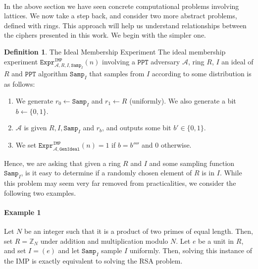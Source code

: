 \documentclass{article}
\theoremstyle{definition}
\newtheorem{definition}{Definition}[section]
\theoremstyle{example}
\newcommand{\A}{\mathcal{A}}
\newcommand{\Int}{\mathbb{Z}}
\newcommand{\PPT}{\texttt{PPT}}
\newcommand{\Expr}[2]{\texttt{Expr}^{\texttt{#1}}_{#2}}
\newcommand{\GenIdeal}{\texttt{GenIdeal}}
\newcommand{\Samp}{\texttt{Samp}}
\begin{document}
\paragraph{} In the above section we have seen concrete computational problems
involving lattices. We now take a step back, and consider two more abstract
problems, defined with rings. This approach will help us understand
relationships between the ciphers presented in this work. We begin with the
simpler one.
\begin{definition}{The Ideal Membership Experiment} The ideal membership experiment
  $\Expr{IMP}{\A, R, I, \Samp_I}(n)$ involving a $\PPT$ adversary $\A$, ring $R$, $I$ an
  ideal of $R$ and $\PPT$ algorithm $\Samp_I$ that samples from $I$
  according to some distribution is as follows:
  \begin{enumerate}
  \item We generate $r_0 \leftarrow \Samp_I$ and $r_1 \leftarrow R$ (uniformly).
    We also generate a bit $b \leftarrow \{0, 1\}$. 
  \item $\A$ is given $R, I, \Samp_I$ and $r_b$, and outputs some bit $b' \in \{0, 1\}$.
  \item We set $\Expr{IMP}{\A, \GenIdeal}(n) = 1$ if $b = b''''$ and $0$ otherwise.
  \end{enumerate}
\end{definition}
Hence, we are asking that given a ring $R$ and $I$ and some sampling function
$\Samp_I$, is it easy to determine if a randomly chosen element of $R$ is in
$I$. While this problem may seem very far removed from practicalities, we
consider the following two examples.
\paragraph{Example 1}
  Let $N$ be an integer such that it is a product of two primes of equal length.
  Then, set $R = \Int_N$ under addition and multiplication modulo $N$. Let $e$
  be a unit in $R$, and set $I = (e)$ and let $\Samp_I$ sample $I$ uniformly. Then,
  solving this instance of the IMP is exactly equivalent to solving the RSA
  problem. 
\end{document}
